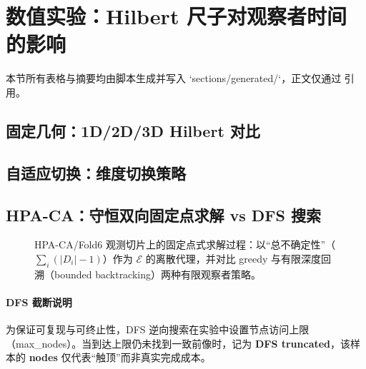 \section{数值实验：Hilbert 尺子对观察者时间的影响}

本节所有表格与摘要均由脚本生成并写入 `sections/generated/`，正文仅通过 \verb|| 引用。

\subsection{固定几何：1D/2D/3D Hilbert 对比}

\begin{table}[H]
\centering
\small
\setlength{\tabcolsep}{4pt}

\caption{不同 Hilbert 维度（固定几何）与自适应切换策略的对比。这里把 WL1 的解析时间（resolve\_t）作为观察者成本 \(\kappaobs\) 的一个 proxy；在最小假设下可等价地理解为负信息时间 \(\tautime\) 的 proxy。当 resolve\_t 为空时，表示在给定最大迭代轮数内未解析到唯一微观区分。}
\label{tab:observer_hilbert_compare}
\end{table}



\subsection{自适应切换：维度切换策略}



\subsection{HPA-CA：守恒双向固定点求解 vs DFS 搜索}

\begin{figure}[H]
\centering

\caption{HPA-CA/Fold6 观测切片上的固定点式求解过程：以“总不确定性”（\(\sum_i(|D_i|-1)\)）作为 \(\mathcal E\) 的离散代理，并对比 greedy 与有限深度回溯（bounded backtracking）两种有限观察者策略。}
\label{fig:hpa_ca_fixed_point_energy_curve}
\end{figure}

\paragraph{DFS 截断说明}
为保证可复现与可终止性，DFS 逆向搜索在实验中设置节点访问上限（max\_nodes）。当到达上限仍未找到一致前像时，记为 \textbf{DFS truncated}，该样本的 \textbf{nodes} 仅代表“触顶”而非真实完成成本。

